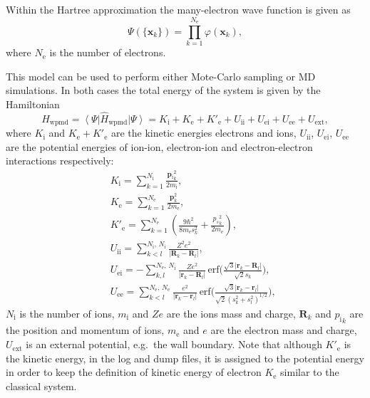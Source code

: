 \documentclass[a4paper,12pt]{article}
\begin{document}
Within the Hartree approximation the many-electron wave function is given as
\begin{equation}
  \Psi(\{\mathbf{x}_k\}) = \prod_{k=1}^{N_\mathrm{e}}\varphi(\mathbf{x}_k),
\end{equation}
where $N_\mathrm{e}$ is the number of electrons.

This model can be used to perform either Mote-Carlo sampling or MD simulations. In both cases the total energy of the system is given by the Hamiltonian
\begin{equation}
  H_\mathrm{wpmd}
  = \left\langle \Psi \right| \hat{H}_\mathrm{wpmd} \left| \Psi \right\rangle
  = K_\mathrm{i} + K_\mathrm{e} + K'_\mathrm{e} + U_\mathrm{ii} + U_\mathrm{ei} + U_\mathrm{ee} + U_\mathrm{ext},
\end{equation}
where $K_\mathrm{i}$ and $K_\mathrm{e} + K'_\mathrm{e}$ are the kinetic energies electrons and ions, $U_\mathrm{ii}$, $U_\mathrm{ei}$, $U_\mathrm{ee}$ are the potential energies of ion-ion, electron-ion and electron-electron interactions respectively:
\begin{eqnarray}
  && K_\mathrm{i} = \sum\limits_{k=1}^{N_\mathrm{i}} \frac{\mathbf{p_\mathrm{i}}_k^2}{2m_\mathrm{i}},
  \nonumber\\
  && K_\mathrm{e} = \sum_{k=1}^{N_\mathrm{e}} \frac{\mathbf{p}_k^2}{2m_\mathrm{e}},
  \nonumber\\
  && K'_\mathrm{e} = \sum_{k=1}^{N_\mathrm{e}} \left( \frac{9\hbar^2}{8m_\mathrm{e}s^2_k} 
  + \frac{{p_s}_k^2}{2m_\mathrm{e}} \right),
  \nonumber\\
  && U_\mathrm{ii} = \sum\limits_{k<l}^{N_\mathrm{i},\,N_\mathrm{i}}\!
  \frac{Z^2 e^2}{\left| \mathbf{R}_k - \mathbf{R}_l \right|},
  \nonumber\\
  && U_\mathrm{ei} = 
  - \sum_{k,l}^{N_\mathrm{e},\,N_\mathrm{i}}\!
  \frac{Z e^2}{|\mathbf{r}_k-\mathbf{R}_l|}\,
  \mathrm{erf} \!\Bigg(\frac{\sqrt{3}|\mathbf{r}_k - \mathbf{R}_l|}{\sqrt{2}s_k}\Bigg),
  \nonumber\\
  && U_\mathrm{ee} = \sum_{k<l}^{N_\mathrm{e},\,N_\mathrm{e}}\!
  \frac{e^2}{|\mathbf{r}_k - \mathbf{r}_l|}\,
  \mathrm{erf} \!\Bigg(\frac{\sqrt{3}|\mathbf{r}_k - \mathbf{r}_l|}{\sqrt{2}(s^2_k+s^2_l)^{1/2}}\Bigg),
  \label{eq:Hwpmd}
\end{eqnarray}
$N_\mathrm{i}$ is the number of ions, $m_\mathrm{i}$ and $Ze$ are the ions mass and charge, $\mathbf{R}_k$ and ${p_\mathrm{i}}_k$ are the position and momentum of ions, $m_\mathrm{e}$ and $e$ are the electron mass and charge, $U_\mathrm{ext}$ is an external potential, e.g.\ the wall boundary. Note that although $K'_\mathrm{e}$ is the kinetic energy, in the log and dump files, it is assigned to the potential energy in order to keep the definition of kinetic energy of electron $K_\mathrm{e}$ similar to the classical system.
\end{document}
